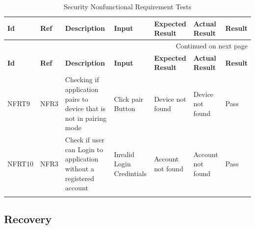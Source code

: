 \documentclass[12pt, titlepage]{article}
\begin{document}
\begin{longtable}{|p{1.4cm}|p{1.1cm}|p{2.5cm}|p{1.5cm}|p{2.2cm}|p{1.9cm}|p{1.2cm}|}

  \endfirsthead
  \hline
  \textbf{Id} & \textbf{Ref} & \textbf{Description}                                                         & \textbf{Input}                                    & \textbf{Expected Result}                                    & \textbf{Actual Result} & \textbf{Result}                                    \\ \hline

  \endhead

  \hline \multicolumn{7}{|r|}{Continued on next page} \\ \hline
  \endfoot

  \endlastfoot
  \hline
  \textbf{Id} & \textbf{Ref} & \textbf{Description}                                                         & \textbf{Input}                                    & \textbf{Expected Result}    & \textbf{Actual Result}                          & \textbf{Result}                                     \\ \hline
  NFRT9        & NFR3          & Checking if application pairs to device that is not in pairing mode              & Click pair Button & Device not found & Device not found & {\color[HTML]{32CB00} Pass}                         \\ \hline
  NFRT10        & NFR3          & Check if user can Login to application without a registered account           & Invalid Login Credintials   &  Account not found      & Account not found    & {\color[HTML]{32CB00} Pass}                         \\ \hline
  \caption{Security Nonfunctional Requirement Tests}
  \label{securityNonfunctionalRequirementTests}
\end{longtable}

\subsection{Recovery}
\end{document}
